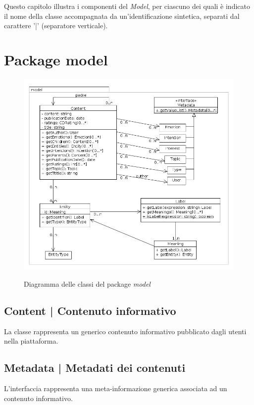 \documentclass[10pt,a4paper,headinclude,footinclude,hidelinks]{scrreprt} %
\begin{document}
	Questo capitolo illustra i componenti del \textit{Model}, per ciascuno dei quali è indicato il nome della classe accompagnata da un'identificazione sintetica, separati dal carattere '|' (separatore verticale).

	\section{Package model}
	\label{sec:stage:design:model}

	\begin{figure}[ht]
		\begin{center}
	    	\includegraphics[width=12cm]{class/model.png}
			\label{gfx:class:model}
			\caption{Diagramma delle classi del package \textit{model}}
		\end{center}
	\end{figure}

	\subsection[Content]{Content | Contenuto informativo}
	\label{sec:stage:design:model:content}
	La classe \textit{} rappresenta un generico contenuto informativo pubblicato dagli utenti nella piattaforma.

	\subsection[Metadata]{Metadata | Metadati dei contenuti}
	\label{sec:stage:design:model:metadata}
	L'interfaccia \textit{} rappresenta una meta-informazione generica associata ad un contenuto informativo.
\end{document}
